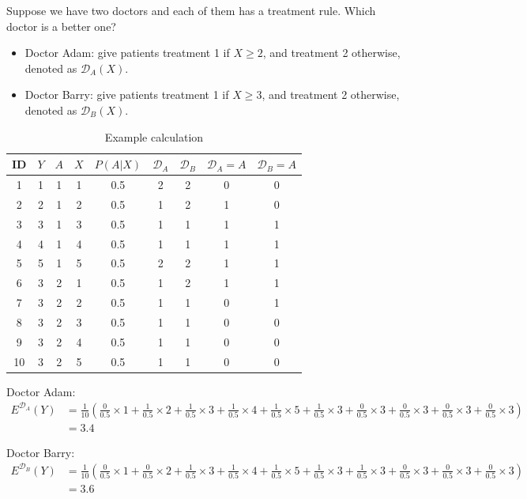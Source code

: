 \documentclass{article}
\begin{document}
Suppose we have two doctors and each of them has a treatment rule.
Which doctor is a better one?
\begin{itemize}
\item Doctor Adam: give patients treatment 1 if $X \geq 2$, and treatment 2 otherwise, denoted as $\mathcal{D}_A\left(X\right)$.
\item Doctor Barry: give patients treatment 1 if $X \geq 3$, and treatment 2 otherwise, denoted as $\mathcal{D}_B\left(X\right)$.
\end{itemize}

\begin{table}[H]
\centering
\caption{Example calculation}
\begin{tabular}{c|ccc|ccccc}
\hline \hline
ID & $Y$ & $A$ & $X$ & $P\left( {A|X} \right)$ & $\mathcal{D}_A$ & $\mathcal{D}_B$ & $\mathcal{D}_A = A$ & $\mathcal{D}_B = A$ \\ \hline
1  & 1 & 1 & 1 & 0.5    & 2  & 2  & 0   & 0   \\
2  & 2 & 1 & 2 & 0.5    & 1  & 2  & 1   & 0   \\
3  & 3 & 1 & 3 & 0.5    & 1  & 1  & 1   & 1   \\
4  & 4 & 1 & 4 & 0.5    & 1  & 1  & 1   & 1   \\
5  & 5 & 1 & 5 & 0.5    & 2  & 2  & 1   & 1   \\
6  & 3 & 2 & 1 & 0.5    & 1  & 2  & 1   & 1   \\
7  & 3 & 2 & 2 & 0.5    & 1  & 1  & 0   & 1   \\
8  & 3 & 2 & 3 & 0.5    & 1  & 1  & 0   & 0   \\
9  & 3 & 2 & 4 & 0.5    & 1  & 1  & 0   & 0   \\
10 & 3 & 2 & 5 & 0.5    & 1  & 1  & 0   & 0   \\ \hline \hline
\end{tabular}
\end{table}

Doctor Adam:
\[
\begin{aligned}
{E^{{\mathcal{D}_A}}}\left( Y \right) &= \frac{1}{{10}}\left( {\frac{0}{{0.5}} \times 1 + \frac{1}{{0.5}} \times 2 + \frac{1}{{0.5}} \times 3 + \frac{1}{{0.5}} \times 4 + \frac{1}{{0.5}} \times 5 + \frac{1}{{0.5}} \times 3 + \frac{0}{{0.5}} \times 3 + \frac{0}{{0.5}} \times 3 + \frac{0}{{0.5}} \times 3 + \frac{0}{{0.5}} \times 3} \right)\\ 
 &= 3.4
\end{aligned}
\]

Doctor Barry:
\[
\begin{aligned}
{E^{{\mathcal{D}_B}}}\left( Y \right) &= \frac{1}{{10}}\left( {\frac{0}{{0.5}} \times 1 + \frac{0}{{0.5}} \times 2 + \frac{1}{{0.5}} \times 3 + \frac{1}{{0.5}} \times 4 + \frac{1}{{0.5}} \times 5 + \frac{1}{{0.5}} \times 3 + \frac{1}{{0.5}} \times 3 + \frac{0}{{0.5}} \times 3 + \frac{0}{{0.5}} \times 3 + \frac{0}{{0.5}} \times 3} \right)\\ 
 &= 3.6
\end{aligned}
\]
\end{document}
